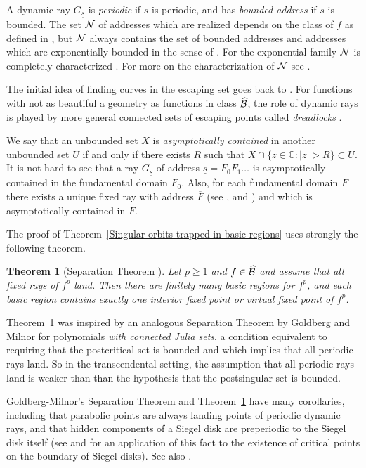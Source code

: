 \documentclass[11pt, twoside]{article}
\newtheorem{thm}{Theorem}[section]
\theoremstyle{definition}
\newcommand{\C}{\mathbb{C}}
\newcommand{\ov}{\overline}
\newcommand{\BB}{{\cal B}}
\newcommand{\NN}{{\cal N}}
\newcommand{\s}{{\underline{s}}}
\newcommand{\BBhat}{\widehat{\BB}}
\begin{document}
A dynamic ray $G_\s$ is \emph{periodic} if $\s$ is periodic, and has \emph{ bounded address} if $\s$ is bounded. The set $\NN$ of addresses  which are realized  depends on  the class of $f$ as defined in \cite{EL92,Re09}, but $\NN$ always contains the set of bounded addresses \cite{Re08,BK07} and addresses which are exponentially bounded in the sense of \cite{BRG17}. For the exponential family $\NN$ is completely characterized \cite{SZEsc}. For more on the characterization of $\NN$ see \cite{ABRG}.

The initial idea of finding curves in the escaping set goes back to \cite{DT86,DK,BK07}.
For functions with not as beautiful a  geometry as functions in class $\BBhat$, the role of dynamic rays is played by more general connected sets of escaping points called \emph{dreadlocks} \cite{BRG17}.
  
We say that an unbounded set $X$ is \emph{asymptotically contained}   in another unbounded set $U$ if and only if there exists $R$ such that $X\cap\{z\in\C: |z|>R\}\subset U$.
It is not hard to see that a ray $G_\s$ of address $\s=F_0F_1\ldots$ is asymptotically contained in the  fundamental domain $F_0$. Also, for each fundamental domain $F$ there exists a unique fixed ray with address $\ov{F}$ (see \cite{Re08}, \cite{BK07} and \cite[Lemma 2.3]{BF15}) and which is asymptotically contained in $F$. 
 
 The proof of Theorem~\ref{Singular orbits trapped in basic regions} uses strongly the following theorem.
 
\begin{thm}[Separation Theorem \cite{BF15}]\label{Separation Theorem Entire} Let  $p\geq 1$ and $f\in\BBhat$ and assume  that all fixed rays of $f^p$ land. Then there are finitely many basic regions for $f^p$, and each basic region  contains exactly one interior fixed point or virtual fixed point of $f^p$.
\end{thm}

Theorem~\ref{Separation Theorem Entire} was inspired by an analogous Separation Theorem by Goldberg and Milnor \cite{GM} for polynomials {\em with connected Julia sets}, a condition equivalent to requiring that the postcritical set is bounded and which implies that all periodic rays land. So in the transcendental setting, the assumption that all periodic rays land is weaker than than the hypothesis that the postsingular set is bounded. 

Goldberg-Milnor's Separation Theorem and Theorem~\ref{Separation Theorem Entire} have many corollaries, including that parabolic points are always landing points of periodic dynamic rays, and that  hidden components of a Siegel disk are preperiodic to the Siegel disk itself (see \cite{CR} and \cite{BF2} for an application of this fact to the existence of critical points on the boundary of Siegel disks). See also \cite{Ki00}.
 
\end{document}
